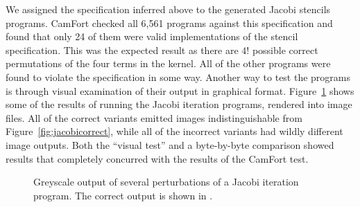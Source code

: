 \documentclass[9pt]{sigplanconf}
\theoremstyle{definition}
\begin{document}
We assigned the specification inferred above to the generated Jacobi
stencils programs. CamFort checked all 6,561 programs against this specification and found that only 24 of them were
valid implementations of the stencil specification. This was the
expected result as there are $4!$ possible correct permutations
of the four terms in the kernel. All of the other programs were found
to violate the specification in some way. Another way to test the
programs is through visual examination of their output in graphical
format. Figure~\ref{fig:jacobi} shows some of the results of running
the Jacobi iteration programs, rendered into image files. All of the
correct variants emitted images indistinguishable from
Figure~\ref{fig:jacobicorrect}, while all of the incorrect variants
had wildly different image outputs. Both the ``visual test'' and a
byte-by-byte comparison showed results that completely concurred with
the results of the CamFort test.

\begin{figure}[t]
  \centering
  \caption{Greyscale output of several perturbations of a Jacobi
    iteration program. The correct output is shown in
    .}
  \label{fig:jacobi}
  \vspace{-2em}
\end{figure}
\end{document}
